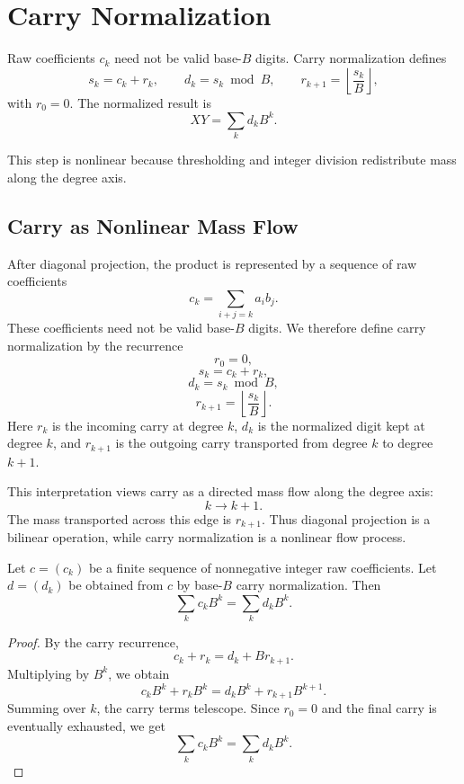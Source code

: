 \section{Carry Normalization}

Raw coefficients $c_k$ need not be valid base-$B$ digits. Carry normalization
defines
\[
  s_k = c_k + r_k,\qquad d_k = s_k \bmod B,\qquad r_{k+1} = \left\lfloor \frac{s_k}{B} \right\rfloor,
\]
with $r_0=0$. The normalized result is
\[
  XY = \sum_k d_k B^k.
\]

This step is nonlinear because thresholding and integer division redistribute
mass along the degree axis.

\subsection{Carry as Nonlinear Mass Flow}

After diagonal projection, the product is represented by a sequence of raw
coefficients
\[
    c_k = \sum_{i+j=k} a_i b_j.
\]
These coefficients need not be valid base-\(B\) digits. We therefore define
carry normalization by the recurrence
\[
    r_0 = 0,
\]
\[
    s_k = c_k + r_k,
\]
\[
    d_k = s_k \bmod B,
\]
\[
    r_{k+1} = \left\lfloor \frac{s_k}{B} \right\rfloor.
\]
Here \(r_k\) is the incoming carry at degree \(k\), \(d_k\) is the normalized
digit kept at degree \(k\), and \(r_{k+1}\) is the outgoing carry transported
from degree \(k\) to degree \(k+1\).

This interpretation views carry as a directed mass flow along the degree axis:
\[
    k \longrightarrow k+1.
\]
The mass transported across this edge is \(r_{k+1}\). Thus diagonal projection
is a bilinear operation, while carry normalization is a nonlinear flow process.

\begin{proposition}
Let \(c=(c_k)\) be a finite sequence of nonnegative integer raw coefficients.
Let \(d=(d_k)\) be obtained from \(c\) by base-\(B\) carry normalization. Then
\[
    \sum_k c_k B^k = \sum_k d_k B^k.
\]
\end{proposition}

\begin{proof}
By the carry recurrence,
\[
    c_k + r_k = d_k + B r_{k+1}.
\]
Multiplying by \(B^k\), we obtain
\[
    c_k B^k + r_k B^k = d_k B^k + r_{k+1}B^{k+1}.
\]
Summing over \(k\), the carry terms telescope. Since \(r_0=0\) and the final
carry is eventually exhausted, we get
\[
    \sum_k c_k B^k = \sum_k d_k B^k.
\]
\end{proof}
